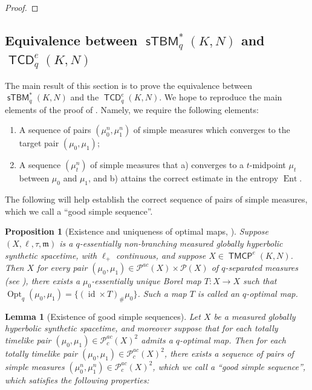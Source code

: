 \documentclass{article}
\newcommand{\m}{\mathfrak{m}}
\newcommand{\Pcal}{\mathcal{P}}
\DeclareMathOperator{\id}{id}
\DeclareMathOperator{\TCD}{\mathsf{TCD}}
\DeclareMathOperator{\sTBM}{\mathsf{sTBM}}
\DeclareMathOperator{\TMCP}{\mathsf{TMCP}}
\DeclareMathOperator{\Opt}{Opt}
\DeclareMathOperator{\Ent}{Ent}
\newtheorem{lemma}[theorem]{Lemma}
\newtheorem{prop}[theorem]{Proposition}
\theoremstyle{definition}
\begin{document}
{\begin{proof}
\end{proof}






\subsection{Equivalence between $\sTBM_q^*(K,N)$ and $\TCD_q^e(K,N)$}
The main result of this section is to prove the equivalence between $\sTBM_q^*(K,N)$ and the $\TCD_q^e(K,N)$.  We hope to reproduce the main elements of the proof of . Namely, we require the following elements: 
\begin{enumerate}
\item A sequence of pairs $(\mu_0^n,\mu_1^n)$ of simple measures which converges to the target pair $(\mu_0,\mu_1)$;
\item A sequence $(\mu_t^n)$ of simple measures that a) converges to a $t$-midpoint $\mu_t$ between $\mu_0$ and $\mu_1$, and b) attains the correct estimate in the entropy $\Ent$. 
\end{enumerate}

The following will help establish the correct sequence of pairs of simple measures, which we call a ``good simple sequence''. 


\begin{prop}[Existence and uniqueness of optimal maps, ]\label{optimalmaps}
Suppose $(X,\ell, \tau, \m)$ is a $q$-essentially non-branching measured globally hyperbolic synthetic spacetime, with $\ell_+$ continuous, and suppose $X\in \TMCP^e(K,N)$. Then $X$ for every pair $(\mu_0,\mu_1)\in \Pcal^{ac}(X)\times \Pcal(X)$ of $q$-separated measures (see ), there exists a $\mu_0$-essentially unique Borel map $T:X\to X$ such that $\Opt_q(\mu_0,\mu_1)=\{(\id\times T)_\# \mu_0\}$. Such a map $T$ is called an {\it $q$-optimal map}.
\end{prop}

\begin{lemma}[Existence of good simple sequences]\label{goodsimplesequence}
Let $X$ be a measured globally hyperbolic synthetic spacetime, and moreover suppose that for each totally timelike pair $(\mu_0,\mu_1)\in \Pcal^{ac}_c(X)^2$ admits a $q$-optimal map. Then for each totally timelike pair $(\mu_0,\mu_1)\in \Pcal_c^{ac}(X)^2$, there exists a sequence of pairs of simple measures $(\mu_0^n, \mu_1^n)\in\Pcal_c^{ac}(X)^2$, which we call a ``good simple sequence'', which satisfies the following properties: 


\end{lemma}}
\end{document}
